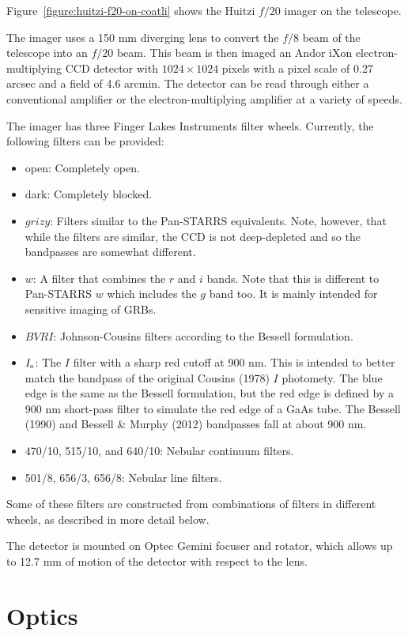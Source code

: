 Figure~\ref{figure:huitzi-f20-on-coatli} shows the Huitzi $f/20$ imager on the telescope.

The imager uses a 150 mm diverging lens to convert the $f/8$ beam of the telescope into an $f/20$ beam. This beam is then imaged an Andor iXon electron-multiplying CCD detector with $1024\times1024$ pixels with a pixel scale of 0.27 arcsec and a field of 4.6 arcmin. The detector can be read through either a conventional amplifier or the electron-multiplying amplifier at a variety of speeds.

The imager has three Finger Lakes Instruments filter wheels. Currently, the following filters can be provided:

\begin{itemize}
\item open: Completely open.
\item dark: Completely blocked.
\item $grizy$: Filters similar to the Pan-STARRS equivalents. Note, however, that while the filters are similar, the CCD is not deep-depleted and so the bandpasses are somewhat different.
\item $w$: A filter that combines the $r$ and $i$ bands. Note that this is different to Pan-STARRS $w$ which includes the $g$ band too. It is mainly intended for sensitive imaging of GRBs.
\item $BVRI$: Johnson-Cousins filters according to the Bessell formulation.
\item $\mbox{$I_\mathrm{s}$}$: The $I$ filter with a sharp red cutoff at 900 nm. This is intended to better match the bandpass of the original Cousins (1978) $I$ photomety. The blue edge is the same as the Bessell formulation, but the red edge is defined by a 900 nm short-pass filter to simulate the red edge of a GaAs tube. The Bessell (1990) and Bessell \& Murphy (2012) bandpasses fall at about 900 nm.
\item 470/10, 515/10, and 640/10: Nebular continuum filters.
\item 501/8, 656/3, 656/8: Nebular line filters.
\end{itemize}

Some of these filters are constructed from combinations of filters in different wheels, as described in more detail below.

The detector is mounted on Optec Gemini focuser and rotator, which allows up to 12.7 mm of motion of the detector with respect to the lens.

\section{Optics}


